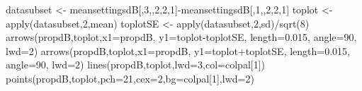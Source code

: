 \documentclass[
]{article}
\newenvironment{Shaded}{\begin{snugshade}}{\end{snugshade}}
\newcommand{\AttributeTok}[1]{\textcolor[rgb]{0.77,0.63,0.00}{#1}}
\newcommand{\DecValTok}[1]{\textcolor[rgb]{0.00,0.00,0.81}{#1}}
\newcommand{\FloatTok}[1]{\textcolor[rgb]{0.00,0.00,0.81}{#1}}
\newcommand{\FunctionTok}[1]{\textcolor[rgb]{0.00,0.00,0.00}{#1}}
\newcommand{\NormalTok}[1]{#1}
\newcommand{\OtherTok}[1]{\textcolor[rgb]{0.56,0.35,0.01}{#1}}
\newcommand{\SpecialCharTok}[1]{\textcolor[rgb]{0.00,0.00,0.00}{#1}}
\begin{document}
\begin{Shaded}
\begin{Highlighting}[]
\NormalTok{datasubset }\OtherTok{\textless{}{-}}\NormalTok{ meansettingsdB[,}\DecValTok{3}\NormalTok{,,}\DecValTok{2}\NormalTok{,}\DecValTok{2}\NormalTok{,}\DecValTok{1}\NormalTok{]}\SpecialCharTok{{-}}\NormalTok{meansettingsdB[,}\DecValTok{1}\NormalTok{,,}\DecValTok{2}\NormalTok{,}\DecValTok{2}\NormalTok{,}\DecValTok{1}\NormalTok{]}
\NormalTok{toplot }\OtherTok{\textless{}{-}} \FunctionTok{apply}\NormalTok{(datasubset,}\DecValTok{2}\NormalTok{,mean)}
\NormalTok{toplotSE }\OtherTok{\textless{}{-}} \FunctionTok{apply}\NormalTok{(datasubset,}\DecValTok{2}\NormalTok{,sd)}\SpecialCharTok{/}\FunctionTok{sqrt}\NormalTok{(}\DecValTok{8}\NormalTok{)}
\FunctionTok{arrows}\NormalTok{(propdB,toplot,}\AttributeTok{x1=}\NormalTok{propdB, }\AttributeTok{y1=}\NormalTok{toplot}\SpecialCharTok{{-}}\NormalTok{toplotSE, }\AttributeTok{length=}\FloatTok{0.015}\NormalTok{, }\AttributeTok{angle=}\DecValTok{90}\NormalTok{, }\AttributeTok{lwd=}\DecValTok{2}\NormalTok{)  }
\FunctionTok{arrows}\NormalTok{(propdB,toplot,}\AttributeTok{x1=}\NormalTok{propdB, }\AttributeTok{y1=}\NormalTok{toplot}\SpecialCharTok{+}\NormalTok{toplotSE, }\AttributeTok{length=}\FloatTok{0.015}\NormalTok{, }\AttributeTok{angle=}\DecValTok{90}\NormalTok{, }\AttributeTok{lwd=}\DecValTok{2}\NormalTok{)  }
\FunctionTok{lines}\NormalTok{(propdB,toplot,}\AttributeTok{lwd=}\DecValTok{3}\NormalTok{,}\AttributeTok{col=}\NormalTok{colpal[}\DecValTok{1}\NormalTok{])}
\FunctionTok{points}\NormalTok{(propdB,toplot,}\AttributeTok{pch=}\DecValTok{21}\NormalTok{,}\AttributeTok{cex=}\DecValTok{2}\NormalTok{,}\AttributeTok{bg=}\NormalTok{colpal[}\DecValTok{1}\NormalTok{],}\AttributeTok{lwd=}\DecValTok{2}\NormalTok{)}


\end{Highlighting}
\end{Shaded}
\end{document}
